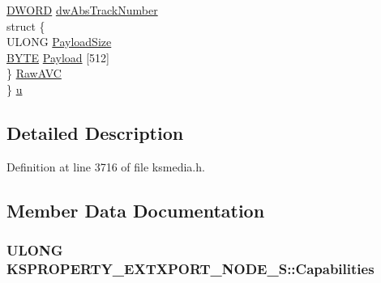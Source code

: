 \begin{DoxyCompactItemize}
\begin{tabbing}
\>\hyperlink{mapinls_8h_ad342ac907eb044443153a22f964bf0af}{DWORD} \hyperlink{struct_k_s_p_r_o_p_e_r_t_y___e_x_t_x_p_o_r_t___n_o_d_e___s_ad546ebc49f5d513f292d38235d4c82e9}{dwAbsTrackNumber}\\
\>struct \{\\
\>\>ULONG \hyperlink{struct_k_s_p_r_o_p_e_r_t_y___e_x_t_x_p_o_r_t___n_o_d_e___s_a8367d654b642f96190cf6d0dd09916ee}{PayloadSize}\\
\>\>\hyperlink{mapinls_8h_a4ae1dab0fb4b072a66584546209e7d58}{BYTE} \hyperlink{struct_k_s_p_r_o_p_e_r_t_y___e_x_t_x_p_o_r_t___n_o_d_e___s_a70ebbb8dc9d82f23af0994b186d2681d}{Payload} \mbox{[}512\mbox{]}\\
\>\} \hyperlink{struct_k_s_p_r_o_p_e_r_t_y___e_x_t_x_p_o_r_t___n_o_d_e___s_a652d6829761d3031d7a36397cdca81cf}{RawAVC}\\
\} \hyperlink{struct_k_s_p_r_o_p_e_r_t_y___e_x_t_x_p_o_r_t___n_o_d_e___s_a2d41a2825300d970d3234a33ffbc4d62}{u}\\

\end{tabbing}\end{DoxyCompactItemize}


\subsection{Detailed Description}


Definition at line 3716 of file ksmedia.\+h.



\subsection{Member Data Documentation}
\subsubsection[{\texorpdfstring{Capabilities}{Capabilities}}]{\setlength{\rightskip}{0pt plus 5cm}U\+L\+O\+NG K\+S\+P\+R\+O\+P\+E\+R\+T\+Y\+\_\+\+E\+X\+T\+X\+P\+O\+R\+T\+\_\+\+N\+O\+D\+E\+\_\+\+S\+::\+Capabilities}\hypertarget{struct_k_s_p_r_o_p_e_r_t_y___e_x_t_x_p_o_r_t___n_o_d_e___s_a8c80b79feb8cc72bc31833dbad5a896a}{}\label{struct_k_s_p_r_o_p_e_r_t_y___e_x_t_x_p_o_r_t___n_o_d_e___s_a8c80b79feb8cc72bc31833dbad5a896a}


